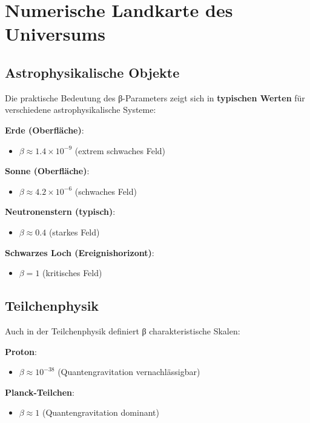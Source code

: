 \documentclass[12pt,a4paper]{report}
\begin{document}
	\section{Numerische Landkarte des Universums}
	
	\subsection{Astrophysikalische Objekte}
	
	Die praktische Bedeutung des β-Parameters zeigt sich in \textbf{typischen Werten} für verschiedene astrophysikalische Systeme:
	
	\textbf{Erde (Oberfläche)}:
	\begin{itemize}
		\item $\beta \approx 1.4 \times 10^{-9}$ (extrem schwaches Feld)
	\end{itemize}
	
	\textbf{Sonne (Oberfläche)}:
	\begin{itemize}
		\item $\beta \approx 4.2 \times 10^{-6}$ (schwaches Feld)
	\end{itemize}
	
	\textbf{Neutronenstern (typisch)}:
	\begin{itemize}
		\item $\beta \approx 0.4$ (starkes Feld)
	\end{itemize}
	
	\textbf{Schwarzes Loch (Ereignishorizont)}:
	\begin{itemize}
		\item $\beta = 1$ (kritisches Feld)
	\end{itemize}
	
	\subsection{Teilchenphysik}
	
	Auch in der Teilchenphysik definiert β charakteristische Skalen:
	
	\textbf{Proton}:
	\begin{itemize}
		\item $\beta \approx 10^{-38}$ (Quantengravitation vernachlässigbar)
	\end{itemize}
	
	\textbf{Planck-Teilchen}:
	\begin{itemize}
		\item $\beta \approx 1$ (Quantengravitation dominant)
	\end{itemize}
	
\end{document}
